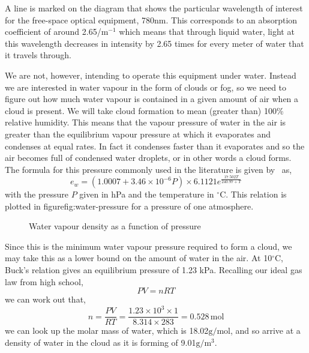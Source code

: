 A line is marked on the diagram that shows the particular wavelength
of interest for the free-space optical equipment, 780nm. This
corresponds to an absorption coefficient of around 2.65/m$^{-1}$ which
means that through liquid water, light at this wavelength decreases in
intensity by 2.65 times for every meter of water that it travels
through.

We are not, however, intending to operate this equipment under
water. Instead we are interested in water vapour in the form of clouds
or fog, so we need to figure out how much water vapour is contained
in a given amount of air when a cloud is present. We will take cloud
formation to mean (greater than) 100\% relative humidity. This means
that the vapour pressure of water in the air is greater than the
equilibrium vapour pressure at which it evaporates and condenses at
equal rates. In fact it condenses faster than it evaporates and so the
air becomes full of condensed water droplets, or in other words a
cloud forms. The formula for this pressure commonly used in the
literature is given by~\cite{buck_new_1981} as,
\begin{equation}
  \label{eq:buck}
  e_w = (1.0007 + 3.46\times 10^{-6}P)\times 6.1121e^{\frac{17.502T}{240.97+T}}
\end{equation}
with the pressure $P$ given in hPa and the temperature in
$^\circ$C. This relation is plotted in figure{fig:water-pressure} for
a pressure of one atmosphere.
\begin{figure}[h]
  \centering
  \caption{Water vapour density as a function of pressure}
  \label{fig:water-pressure}
\end{figure}

Since this is the minimum water vapour pressure required to form a
cloud, we may take this as a lower bound on the amount of water in the
air. At 10$^\circ$C, Buck's relation gives an equilibrium pressure of
1.23 kPa. Recalling our ideal gas law from high school,
\begin{equation}
  \label{eq:ideal-gas}
  PV = nRT
\end{equation}
we can work out that,
\begin{equation*}
  n = \frac{PV}{RT} 
    = \frac{1.23\times 10^3 \times 1}
           {8.314 \times 283}
    = 0.528\, \text{mol}
\end{equation*}
we can look up the molar mass of water, which is
18.02$\text{g}/\text{mol}$, and so arrive at a density of water in the
cloud as it is forming of 9.01$\text{g}/\text{m}^3$. 


